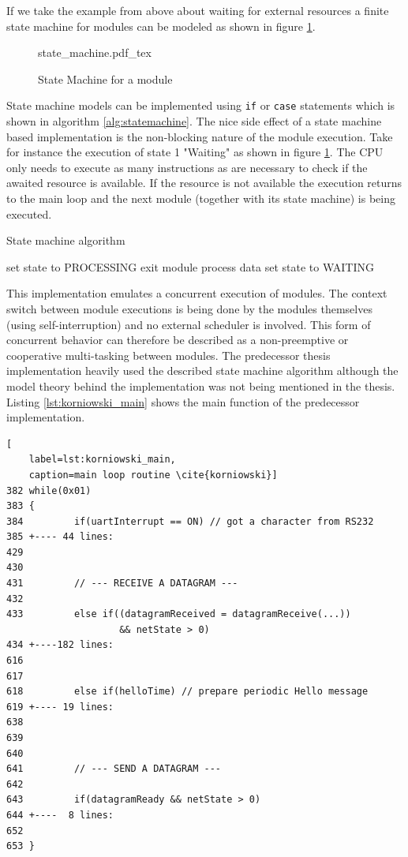 If we take the example from above about waiting for external resources a finite state machine for modules can be modeled as shown in figure \ref{fig:statemachine}.

\begin{figure}[H]
\centering
{state_machine.pdf_tex}
\caption{State Machine for a module}
\label{fig:statemachine}
\end{figure}

State machine models can be implemented using \texttt{if} or \texttt{case} statements which is shown in algorithm \ref{alg:statemachine}. The nice side effect of a state machine based implementation is the non-blocking nature of the module execution. Take for instance the execution of state 1 "Waiting" as shown in figure \ref{fig:statemachine}. The CPU only needs to execute as many instructions as are necessary to check if the awaited resource is available. If the resource is not available the execution returns to the main loop and the next module (together with its state machine) is being executed.

\begin{algorithm}[H]
\caption{State machine algorithm}
\label{alg:statemachine}
\begin{algorithmic}
        \STATE set state to PROCESSING
    \ELSE
        \STATE exit module
    \ENDIF
{}
    \STATE process data
    \STATE set state to WAITING
\ENDIF
\end{algorithmic}
\end{algorithm}

This implementation emulates a concurrent execution of modules. The context switch between module executions is being done by the modules themselves (using self-interruption) and no external scheduler is involved. This form of concurrent behavior can therefore be described as a non-preemptive or cooperative multi-tasking between modules. The predecessor thesis \cite{korniowski} implementation heavily used the described state machine algorithm although the model theory behind the implementation was not being mentioned in the thesis. Listing \ref{lst:korniowski_main} shows the main function of the predecessor implementation.

\begin{lstlisting}[
	label=lst:korniowski_main,
	caption=main loop routine \cite{korniowski}]
382 while(0x01)
383 {
384         if(uartInterrupt == ON) // got a character from RS232
385 +---- 44 lines: 
429 
430 
431         // --- RECEIVE A DATAGRAM ---
432 
433         else if((datagramReceived = datagramReceive(...)) 
                    && netState > 0)     
434 +----182 lines: 
616 
617     
618         else if(helloTime) // prepare periodic Hello message
619 +---- 19 lines: 
638 
639 
640     
641         // --- SEND A DATAGRAM ---
642     
643         if(datagramReady && netState > 0)
644 +----  8 lines: 
652 
653 }
\end{lstlisting}

